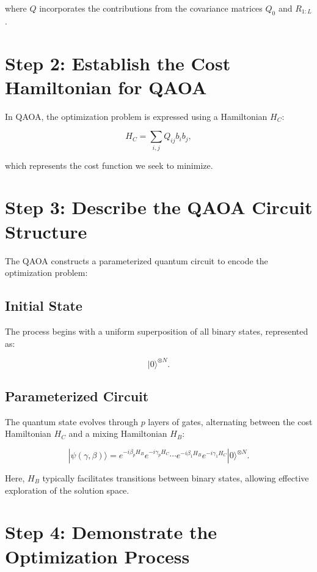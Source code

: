 \documentclass{article}
\begin{document}
where \( Q \) incorporates the contributions from the covariance matrices \( Q_0 \) and \( R_{1:L} \).

\section{Step 2: Establish the Cost Hamiltonian for QAOA}

In QAOA, the optimization problem is expressed using a Hamiltonian \( H_C \):

\begin{equation}
H_C = \sum_{i,j} Q_{ij} b_i b_j,
\end{equation}

which represents the cost function we seek to minimize.

\section{Step 3: Describe the QAOA Circuit Structure}

The QAOA constructs a parameterized quantum circuit to encode the optimization problem:

\subsection{Initial State}
The process begins with a uniform superposition of all binary states, represented as:

\begin{equation}
|0\rangle^{\otimes N}.
\end{equation}

\subsection{Parameterized Circuit}
The quantum state evolves through \( p \) layers of gates, alternating between the cost Hamiltonian \( H_C \) and a mixing Hamiltonian \( H_B \):

\begin{equation}
|\psi(\gamma, \beta)\rangle = e^{-i \beta_p H_B} e^{-i \gamma_p H_C} \cdots e^{-i \beta_1 H_B} e^{-i \gamma_1 H_C} |0\rangle^{\otimes N}.
\end{equation}

Here, \( H_B \) typically facilitates transitions between binary states, allowing effective exploration of the solution space.

\section{Step 4: Demonstrate the Optimization Process}
\end{document}
